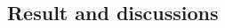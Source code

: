 \documentclass[final]{beamer}\usepackage[]{graphicx}\usepackage[]{color}
\begin{document}
\begin{frame}[fragile]
\begin{multicols}{2}
\section{Result and discussions}

 


\end{multicols}
\end{frame}
\end{document}
